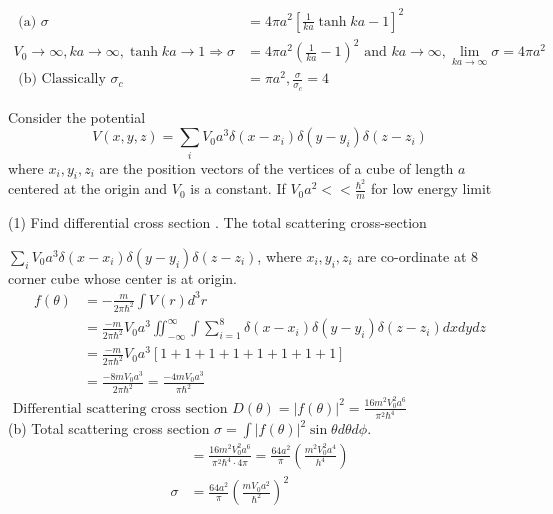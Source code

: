 \begin{enumerate}
\begin{minipage}{\textwidth}
\end{minipage}
\begin{answer}
	\begin{align*}
		\text { (a) } \sigma&=4 \pi a^{2}\left[\frac{1}{k a} \tanh k a-1\right]^{2}\\
	V_{0} \rightarrow \infty, k a \rightarrow \infty, \tanh k a \rightarrow 1 \Rightarrow \sigma&=4 \pi a^{2}\left(\frac{1}{k a}-1\right)^{2} \text { and } k a \rightarrow \infty, \lim _{k a \rightarrow \infty} \sigma=4 \pi a^{2}\\
	\text { (b) Classically } \sigma_{c}&=\pi a^{2}, \frac{\sigma}{\sigma_{c}}=4
	\end{align*}
\end{answer}
	\begin{minipage}{\textwidth}
	\item Consider the potential
	$$
	V(x, y, z)=\sum_{i} V_{0} a^{3} \delta\left(x-x_{i}\right) \delta\left(y-y_{i}\right) \delta\left(z-z_{i}\right)
	$$
	where $x_{i}, y_{i}, z_{i}$ are the position vectors of the vertices of a cube of length $a$ centered at the origin and $V_{0}$ is a constant. If $V_{0} a^{2}<<\frac{\hbar^{2}}{m}$ for low energy limit
	 \begin{tasks}(1)
		\task[\text{a)}] Find differential cross section .
		\task[\text{b)}]The total scattering cross-section
	\end{tasks}
\end{minipage}
\begin{answer}
	 $\sum_{i} V_{0} a^{3} \delta\left(x-x_{i}\right) \delta\left(y-y_{i}\right) \delta\left(z-z_{i}\right)$, where $x_{i}, y_{i}, z_{i}$ are co-ordinate at 8 corner cube whose center is at origin.\\
	 \begin{align*}
	 	f(\theta) &=-\frac{m}{2 \pi \hbar^{2}} \int V(r) d^{3} r \\
	 	&=\frac{-m}{2 \pi \hbar^{2}} V_{0} a^{3} \iint_{-\infty}^{\infty} \int \sum_{i=1}^{8} \delta\left(x-x_{i}\right) \delta\left(y-y_{i}\right) \delta\left(z-z_{i}\right) d x d y d z \\
	 	&=\frac{-m}{2 \pi \hbar^{2}} V_{0} a^{3}[1+1+1+1+1+1+1+1] \\
	 	&=\frac{-8 m V_{0} a^{3}}{2 \pi \hbar^{2}}=\frac{-4 m V_{0} a^{3}}{\pi \hbar^{2}}
	 \end{align*}
	 $\text { Differential scattering cross section } D(\theta)=|f(\theta)|^{2}=\frac{16 m^{2} V_{0}^{2} a^{6}}{\pi^{2} \hbar^{4}}$\\
	 (b) Total scattering cross section $\sigma=\int|f(\theta)|^{2} \sin \theta d \theta d \phi$.
	 \begin{align*}
	 &=\frac{16 m^{2} V_{0}^{2} a^{6}}{\pi^{2} \hbar^{4} \cdot 4 \pi}=\frac{64 a^{2}}{\pi}\left(\frac{m^{2} V_{0}^{2} a^{4}}{h^{4}}\right) \\
	 \sigma &=\frac{64 a^{2}}{\pi}\left(\frac{m V_{0} a^{2}}{\hbar^{2}}\right)^{2}
	 \end{align*}
\end{answer}

\end{enumerate}